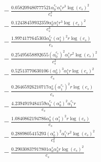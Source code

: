 \documentclass[10pt]{article}
\begin{document}
\begin{align*}
&{}  - \frac{0.058209480777521 \alpha_{0}^{c_s} \alpha_{1}^s r^{3} \log{\left(c_{s} \right)}^{2}}{c_{s}^{3}} \\
&{}  - \frac{0.12438459932359 \alpha_{0}^s \alpha_{1}^s r^{3} \log{\left(c_{s} \right)}^{2}}{c_{s}^{3}} \\
&{}  - \frac{1.9974177645303 \alpha_{0}^{c_s} \left(\alpha_{1}^s\right)^{2} r \log{\left(c_{s} \right)}}{c_{s}} \\
&{}  - \frac{0.25495658892655 \left(\alpha_{0}^{c_s}\right)^{2} \alpha_{1}^s r^{2} \log{\left(c_{s} \right)}^{2}}{c_{s}^{2}} \\
&{}  - \frac{0.52513770630106 \left(\alpha_{0}^s\right)^{3} \alpha_{1}^s r \log{\left(c_{s} \right)}^{2}}{c_{s}} \\
&{}  - \frac{0.26465926210717 \alpha_{0}^s \left(\alpha_{1}^{c_s}\right)^{2} r \log{\left(c_{s} \right)}}{c_{s}} \\
&{}  - \frac{4.2394919484159 \alpha_{0}^{c_s} \left(\alpha_{0}^s\right)^{2} \alpha_{1}^{c_s} r}{c_{s}} \\
&{}  - \frac{1.0840862194786 \alpha_{0}^s \left(\alpha_{1}^s\right)^{2} r \log{\left(c_{s} \right)}}{c_{s}} \\
&{}  - \frac{0.2889805415293 \left(\alpha_{0}^s\right)^{2} \alpha_{1}^{c_s} r^{2} \log{\left(c_{s} \right)}^{2}}{c_{s}^{2}} \\
&{}  - \frac{0.29030837917801 \alpha_{0}^s \alpha_{3}^s r \log{\left(c_{s} \right)}^{2}}{c_{s}}
\end{align*}
\end{document}
